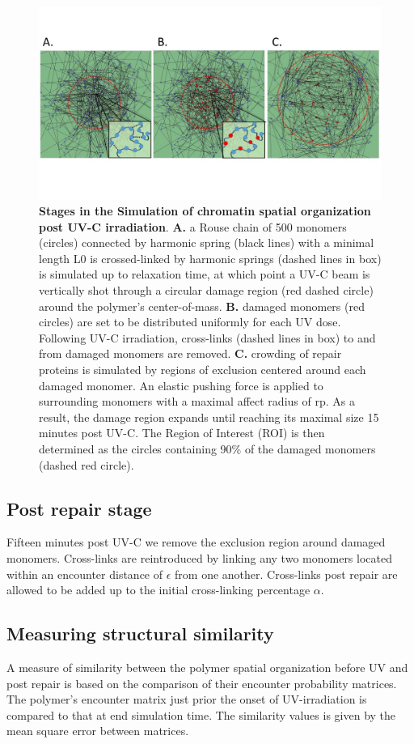 \documentclass[12pt]{article}
\begin{document}
	\begin{figure}[H]
	\includegraphics[width=0.9\linewidth, height=0.35\textheight]{threeStagesOfSimulation}
	\caption{\textbf{Stages in the Simulation of chromatin spatial organization post UV-C irradiation}. \textbf{A.} a Rouse chain of 500 monomers (circles) connected by harmonic spring (black lines) with a minimal length L0 is crossed-linked by harmonic springs (dashed lines in box) is simulated up to relaxation time, at which point a UV-C beam is vertically shot through a circular damage region (red dashed circle) around the polymer’s center-of-mass. \textbf{B.}  damaged monomers (red circles) are set to be distributed uniformly for each UV dose. Following UV-C irradiation, cross-links (dashed lines in box) to and from damaged monomers are removed. \textbf{C.} crowding of repair proteins is simulated by regions of exclusion centered around each damaged monomer. An elastic pushing force is applied to surrounding monomers with a maximal affect radius of rp. As a result, the damage region expands until reaching its maximal size 15 minutes post UV-C. The Region of Interest (ROI) is then determined as the circles containing 90\% of the damaged monomers (dashed red circle).}
	\label{fig:threeStagesOfSimulation}
	\end{figure}
	
	\subsection{Post repair stage}
	Fifteen minutes post UV-C we remove the exclusion region around damaged monomers. Cross-links are reintroduced by linking any two monomers located within an encounter distance of $\epsilon$ from one another. Cross-links post repair are allowed to be added up to the initial cross-linking percentage $\alpha$.
	
	\subsection{Measuring structural similarity}
	A measure of similarity between the polymer spatial organization before UV and post repair is based on the comparison of their encounter probability matrices. The polymer's encounter matrix just prior the onset of UV-irradiation is compared to that at end simulation time. The similarity values is given by the mean square error between matrices. 
			
	
\end{document}
